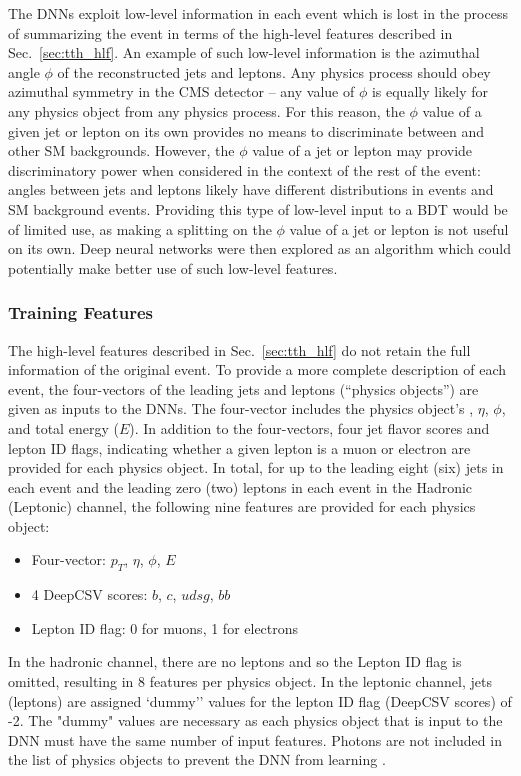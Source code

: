 The DNNs exploit low-level information in each event which is lost in the process of summarizing the event in terms of the high-level features described in Sec.~\ref{sec:tth_hlf}.
An example of such low-level information is the azimuthal angle $\phi$ of the reconstructed jets and leptons.
Any physics process should obey azimuthal symmetry in the CMS detector -- any value of $\phi$ is equally likely for any physics object from any physics process.
For this reason, the $\phi$ value of a given jet or lepton on its own provides no means to discriminate between \ttH and other SM backgrounds.
However, the $\phi$ value of a jet or lepton may provide discriminatory power when considered in the context of the rest of the event: angles between jets and leptons likely have different distributions in \ttH events and SM background events.
Providing this type of low-level input to a BDT would be of limited use, as making a splitting on the $\phi$ value of a jet or lepton is not useful on its own.
Deep neural networks were then explored as an algorithm which could potentially make better use of such low-level features.

\subsubsection{Training Features}
The high-level features described in Sec.~\ref{sec:tth_hlf} do not retain the full information of the original event.
To provide a more complete description of each event, the four-vectors of the leading jets and leptons (``physics objects'') are given as inputs to the DNNs.
The four-vector includes the physics object's \pT, $\eta$, $\phi$, and total energy ($E$).
In addition to the four-vectors, four jet flavor scores and lepton ID flags, indicating whether a given lepton is a muon or electron are provided for each physics object.
In total, for up to the leading eight (six) jets in each event and the leading zero (two) leptons in each event in the Hadronic (Leptonic) channel, the following nine features are provided for each physics object:
\begin{itemize}
    \item Four-vector: $p_T$, $\eta$, $\phi$, $E$
    \item 4 DeepCSV scores: $b$, $c$, $udsg$, $bb$
    \item Lepton ID flag: 0 for muons, 1 for electrons
\end{itemize}
In the hadronic channel, there are no leptons and so the Lepton ID flag is omitted, resulting in 8 features per physics object.
In the leptonic channel, jets (leptons) are assigned `dummy'' values for the lepton ID flag (DeepCSV scores) of -2.
The "dummy" values are necessary as each physics object that is input to the DNN must have the same number of input features.
Photons are not included in the list of physics objects to prevent the DNN from learning \mH.

